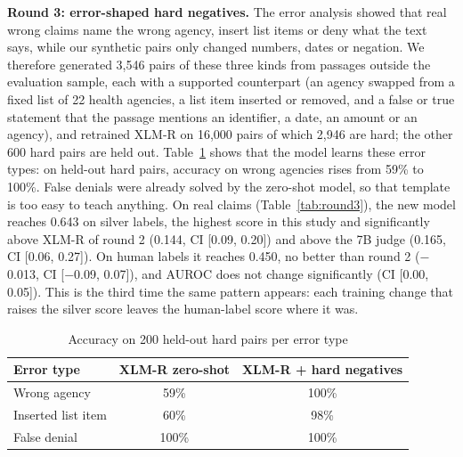 \documentclass[conference]{IEEEtran}
\begin{document}
\textbf{Round 3: error-shaped hard negatives.} The error analysis showed that real wrong claims name the wrong agency, insert list items or deny what the text says, while our synthetic pairs only changed numbers, dates or negation. We therefore generated 3,546 pairs of these three kinds from passages outside the evaluation sample, each with a supported counterpart (an agency swapped from a fixed list of 22 health agencies, a list item inserted or removed, and a false or true statement that the passage mentions an identifier, a date, an amount or an agency), and retrained XLM-R on 16,000 pairs of which 2,946 are hard; the other 600 hard pairs are held out. Table~\ref{tab:harddev} shows that the model learns these error types: on held-out hard pairs, accuracy on wrong agencies rises from 59\% to 100\%. False denials were already solved by the zero-shot model, so that template is too easy to teach anything. On real claims (Table~\ref{tab:round3}), the new model reaches 0.643 on silver labels, the highest score in this study and significantly above XLM-R of round 2 (0.144, CI [0.09, 0.20]) and above the 7B judge (0.165, CI [0.06, 0.27]). On human labels it reaches 0.450, no better than round 2 ($-$0.013, CI [$-$0.09, 0.07]), and AUROC does not change significantly (CI [0.00, 0.05]). This is the third time the same pattern appears: each training change that raises the silver score leaves the human-label score where it was.

\begin{table}[t]
\caption{Accuracy on 200 held-out hard pairs per error type}
\label{tab:harddev}
\centering
\footnotesize
\begin{tabular}{lcc}
\toprule
Error type & XLM-R zero-shot & XLM-R + hard negatives \\
\midrule
Wrong agency & 59\% & 100\% \\
Inserted list item & 60\% & 98\% \\
False denial & 100\% & 100\% \\
\bottomrule
\end{tabular}
\end{table}
\end{document}
